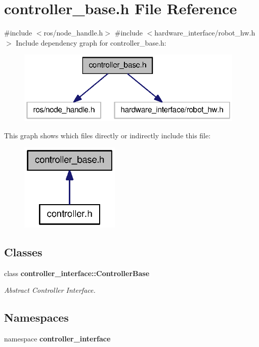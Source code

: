 \section{controller\-\_\-base.\-h \-File \-Reference}
\label{controller__base_8h}
{\ttfamily \#include $<$ros/node\-\_\-handle.\-h$>$}\*
{\ttfamily \#include $<$hardware\-\_\-interface/robot\-\_\-hw.\-h$>$}\*
\-Include dependency graph for controller\-\_\-base.\-h\-:
\nopagebreak
\begin{figure}[H]
\begin{center}
\leavevmode
\includegraphics[width=308pt]{controller__base_8h__incl}
\end{center}
\end{figure}
\-This graph shows which files directly or indirectly include this file\-:
\nopagebreak
\begin{figure}[H]
\begin{center}
\leavevmode
\includegraphics[width=134pt]{controller__base_8h__dep__incl}
\end{center}
\end{figure}
\subsection*{\-Classes}
\begin{DoxyCompactItemize}
\item 
class {\bf controller\-\_\-interface\-::\-Controller\-Base}
\begin{DoxyCompactList}\small\item\em \-Abstract \-Controller \-Interface. \end{DoxyCompactList}\end{DoxyCompactItemize}
\subsection*{\-Namespaces}
\begin{DoxyCompactItemize}
\item 
namespace {\bf controller\-\_\-interface}
\end{DoxyCompactItemize}
